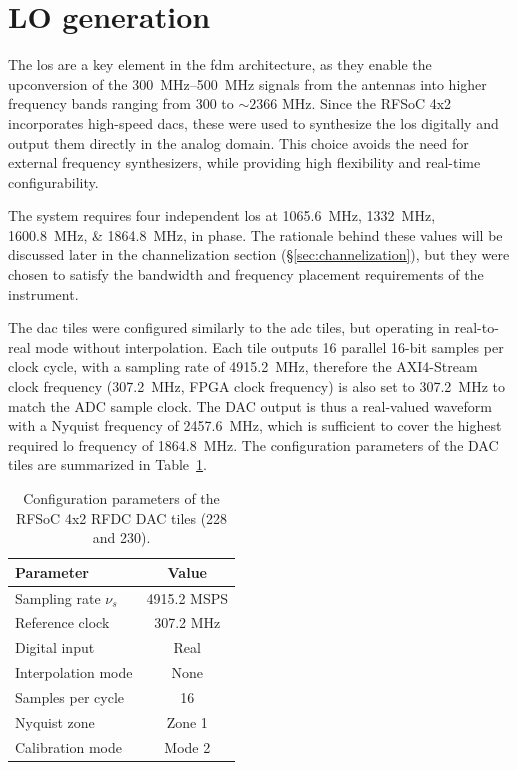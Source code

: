 \section{LO generation}

The \glspl{lo} are a key element in the \gls{fdm} architecture, as they enable the upconversion of the \qtyrange{300}{500}{\mega\hertz} signals from the antennas into higher frequency bands ranging from 300 to $\sim 2366$ MHz. Since the RFSoC 4x2 incorporates high-speed \glspl{dac}, these were used to synthesize the \glspl{lo} digitally and output them directly in the analog domain. This choice avoids the need for external frequency synthesizers, while providing high flexibility and real-time configurability.

The system requires four independent \glspl{lo} at \SIlist{1065.6;1332;1600.8;1864.8}{\mega\hertz}, in phase. The rationale behind these values will be discussed later in the channelization section (\S\ref{sec:channelization}), but they were chosen to satisfy the bandwidth and frequency placement requirements of the instrument.

The \gls{dac} tiles were configured similarly to the \gls{adc} tiles, but operating in real-to-real mode without interpolation. Each tile outputs 16 parallel 16-bit samples per clock cycle, with a sampling rate of \SI{4915.2}{\mega\hertz}, therefore the AXI4-Stream clock frequency (\SI{307.2}{\mega\hertz}, FPGA clock frequency) is also set to \SI{307.2}{\mega\hertz} to match the ADC sample clock. The DAC output is thus a real-valued waveform with a Nyquist frequency of \SI{2457.6}{\mega\hertz}, which is sufficient to cover the highest required \gls{lo} frequency of \SI{1864.8}{\mega\hertz}. The configuration parameters of the DAC tiles are summarized in Table~\ref{tab:dac_config}.
\begin{table}[t]
\centering
\caption{Configuration parameters of the RFSoC 4x2 RFDC DAC tiles (228 and 230).}
\begin{tabular}{lc}
\toprule
\textbf{Parameter} & \textbf{Value} \\
\midrule
Sampling rate $\nu_s$ & 4915.2 MSPS \\
Reference clock & 307.2 MHz \\
Digital input & Real \\
Interpolation mode & None \\
Samples per cycle & 16 \\
Nyquist zone & Zone 1 \\
Calibration mode & Mode 2 \\
\bottomrule
\end{tabular}
\label{tab:dac_config}
\end{table}


